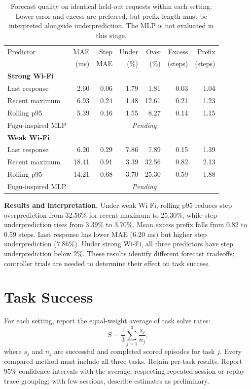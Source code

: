 \documentclass[11pt]{article}
\begin{document}
\begin{table}[htbp]
\centering
\caption{Forecast quality on identical held-out requests within each setting. Lower error and excess are preferred, but prefix length must be interpreted alongside underprediction. The MLP is not evaluated in this stage.}
\label{tab:prediction}
\scriptsize
\setlength{\tabcolsep}{4pt}
\begin{tabularx}{\linewidth}{Xrrrrrr}
\toprule
Predictor & MAE & Step & Under & Over & Excess & Prefix\\
 & (ms) & MAE & (\%) & (\%) & (steps) & (steps)\\
\midrule
\multicolumn{7}{l}{\textbf{Strong Wi-Fi}} \\
Last response & 2.60 & 0.06 & 1.79 & 1.81 & 0.03 & 1.04 \\
Recent maximum & 6.93 & 0.24 & 1.48 & 12.61 & 0.21 & 1.23 \\
Rolling p95 & 5.39 & 0.16 & 1.55 & 8.27 & 0.14 & 1.15 \\
Fugu-inspired MLP & \multicolumn{6}{c}{\textit{Pending}} \\
\midrule
\multicolumn{7}{l}{\textbf{Weak Wi-Fi}} \\
Last response & 6.20 & 0.29 & 7.86 & 7.89 & 0.15 & 1.39 \\
Recent maximum & 18.41 & 0.91 & 3.39 & 32.56 & 0.82 & 2.13 \\
Rolling p95 & 14.21 & 0.68 & 3.70 & 25.30 & 0.59 & 1.88 \\
Fugu-inspired MLP & \multicolumn{6}{c}{\textit{Pending}} \\
\bottomrule
\end{tabularx}
\end{table}
\textbf{Results and interpretation.} Under weak Wi-Fi, rolling p95 reduces step overprediction from 32.56\% for recent maximum to 25.30\%, while step underprediction rises from 3.39\% to 3.70\%. Mean excess prefix falls from 0.82 to 0.59 steps. Last response has lower MAE (6.20 ms) but higher step underprediction (7.86\%). Under strong Wi-Fi, all three predictors have step underprediction below 2\%. These results identify different forecast tradeoffs; controller trials are needed to determine their effect on task success.

\section{Task Success}
For each setting, report the equal-weight average of task solve rates:
\[
 \bar S=\frac{1}{3}\sum_{j=1}^{3}\frac{s_j}{n_j},
\]
where $s_j$ and $n_j$ are successful and completed scored episodes for task $j$. Every compared method must include all three tasks. Retain per-task results. Report 95\% confidence intervals with the average, respecting repeated session or replay-trace grouping; with few sessions, describe estimates as preliminary.
\end{document}
